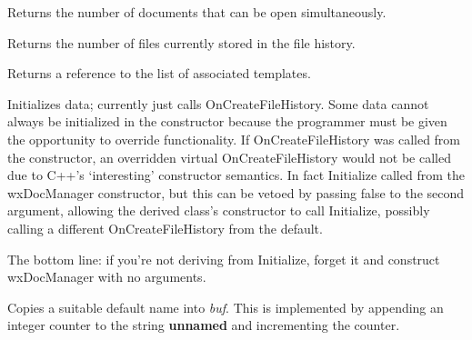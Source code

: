\label{wxdocmanagergetmaxdocsopen}


Returns the number of documents that can be open simultaneously.


\label{wxdocmanagergethistoryfilescount}


Returns the number of files currently stored in the file history.


\label{wxdocmanagergettemplates}


Returns a reference to the list of associated templates.


\label{wxdocmanagerinitialize}


Initializes data; currently just calls OnCreateFileHistory. Some data cannot
always be initialized in the constructor because the programmer must be given
the opportunity to override functionality. If OnCreateFileHistory was called
from the constructor, an overridden virtual OnCreateFileHistory would not be
called due to C++'s `interesting' constructor semantics. In fact Initialize
 called from the wxDocManager constructor, but this can be
vetoed by passing false to the second argument, allowing the derived class's
constructor to call Initialize, possibly calling a different OnCreateFileHistory
from the default.

The bottom line: if you're not deriving from Initialize, forget it and
construct wxDocManager with no arguments.


\label{wxdocmanagermakedefaultname}


Copies a suitable default name into {\it buf}. This is implemented by
appending an integer counter to the string {\bf unnamed} and incrementing
the counter.



\label{wxdocmanageroncreatefilehistory}

